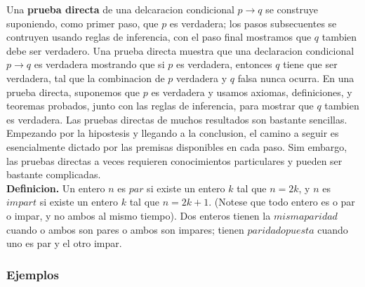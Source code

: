 \documentclass[]{article}
\begin{document}
Una \textbf{prueba directa} de una delcaracion condicional $p \rightarrow q$ se construye suponiendo, como primer paso, que $p$ es verdadera; los pasos subsecuentes se contruyen usando reglas de inferencia, con el paso final mostramos que $q$ tambien debe ser verdadero. Una prueba directa muestra que una declaracion condicional $p \rightarrow q$ es verdadera mostrando que si $p$ es verdadera, entonces $q$ tiene que ser verdadera, tal que la combinacion de $p$ verdadera y $q$ falsa nunca ocurra. En una prueba directa, suponemos que $p$ es verdadera y usamos axiomas, definiciones, y teoremas probados, junto con las reglas de inferencia, para mostrar que $q$ tambien es verdadera. Las pruebas directas de muchos resultados son bastante sencillas. Empezando por la hipostesis y llegando a la conclusion, el camino a seguir es esencialmente dictado por las premisas disponibles en cada paso. Sim embargo, las pruebas directas a veces requieren conocimientos particulares y pueden ser bastante complicadas.\\

\textbf{Definicion.} Un entero $n$ es $par$ si existe un entero $k$ tal que $n = 2k$, y $n$ es $impart$ si existe un entero $k$ tal que $n = 2k + 1$. (Notese que todo entero es o par o impar, y no ambos al mismo tiempo). Dos enteros tienen la $misma paridad$ cuando o ambos son pares o ambos son impares; tienen $paridad opuesta$ cuando uno es par y el otro impar.

\subsubsection*{Ejemplos}
\end{document}
